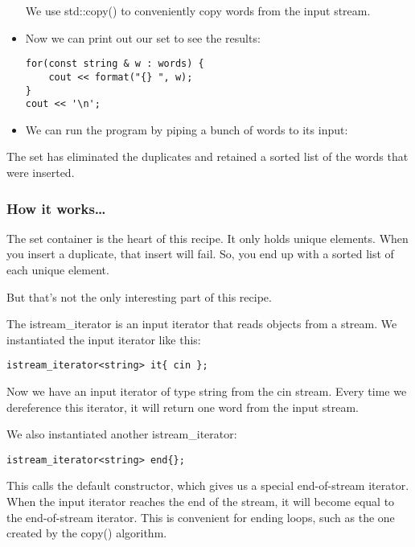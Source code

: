 \begin{itemize}
We use std::copy() to conveniently copy words from the input stream.

\item 
Now we can print out our set to see the results:

\begin{lstlisting}[style=styleCXX]
for(const string & w : words) {
	cout << format("{} ", w);
}
cout << '\n';
\end{lstlisting}

\item 
We can run the program by piping a bunch of words to its input:

\end{itemize}

The set has eliminated the duplicates and retained a sorted list of the words that were inserted.

\subsubsection{How it works…}

The set container is the heart of this recipe. It only holds unique elements. When you insert a duplicate, that insert will fail. So, you end up with a sorted list of each unique element.

But that's not the only interesting part of this recipe.

The istream\_iterator is an input iterator that reads objects from a stream.
We instantiated the input iterator like this:

\begin{lstlisting}[style=styleCXX]
istream_iterator<string> it{ cin };
\end{lstlisting}

Now we have an input iterator of type string from the cin stream. Every time we dereference this iterator, it will return one word from the input stream.

We also instantiated another istream\_iterator:

\begin{lstlisting}[style=styleCXX]
istream_iterator<string> end{};
\end{lstlisting}

This calls the default constructor, which gives us a special end-of-stream iterator. When the input iterator reaches the end of the stream, it will become equal to the end-of-stream iterator. This is convenient for ending loops, such as the one created by the copy() algorithm.

